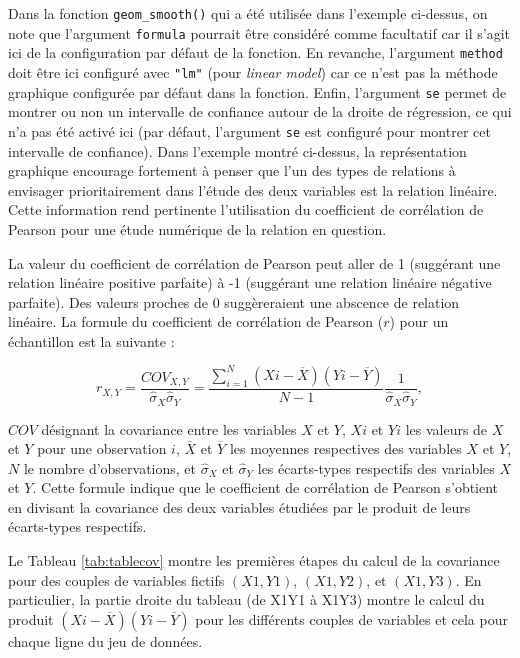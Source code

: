 \documentclass[
]{book}
\begin{document}
Dans la fonction \texttt{geom\_smooth()} qui a été utilisée dans l'exemple ci-dessus, on note que l'argument \texttt{formula} pourrait être considéré comme facultatif car il s'agit ici de la configuration par défaut de la fonction. En revanche, l'argument \texttt{method} doit être ici configuré avec \texttt{"lm"} (pour \emph{linear model}) car ce n'est pas la méthode graphique configurée par défaut dans la fonction. Enfin, l'argument \texttt{se} permet de montrer ou non un intervalle de confiance autour de la droite de régression, ce qui n'a pas été activé ici (par défaut, l'argument \texttt{se} est configuré pour montrer cet intervalle de confiance). Dans l'exemple montré ci-dessus, la représentation graphique encourage fortement à penser que l'un des types de relations à envisager prioritairement dans l'étude des deux variables est la relation linéaire. Cette information rend pertinente l'utilisation du coefficient de corrélation de Pearson pour une étude numérique de la relation en question.

La valeur du coefficient de corrélation de Pearson peut aller de 1 (suggérant une relation linéaire positive parfaite) à -1 (suggérant une relation linéaire négative parfaite). Des valeurs proches de 0 suggèreraient une abscence de relation linéaire. La formule du coefficient de corrélation de Pearson (\(r\)) pour un échantillon est la suivante :

\[r_{X,Y} =  {\frac{COV_{X,Y}}{\hat{\sigma}_{X} \hat{\sigma}_{Y}}} =  {\frac{\sum_{i=1}^{N} (X{i} - \overline{X}) (Y{i} - \overline{Y})}{N-1}} {\frac{1}{\hat{\sigma}_{X} \hat{\sigma}_{Y}}},\]

\(COV\) désignant la covariance entre les variables \(X\) et \(Y\), \(X{i}\) et \(Y{i}\) les valeurs de \(X\) et \(Y\) pour une observation \(i\), \(\overline{X}\) et \(\overline{Y}\) les moyennes respectives des variables \(X\) et \(Y\), \(N\) le nombre d'observations, et \(\hat{\sigma}_{X}\) et \(\hat{\sigma}_{Y}\) les écarts-types respectifs des variables \(X\) et \(Y\). Cette formule indique que le coefficient de corrélation de Pearson s'obtient en divisant la covariance des deux variables étudiées par le produit de leurs écarts-types respectifs.

Le Tableau \ref{tab:tablecov} montre les premières étapes du calcul de la covariance pour des couples de variables fictifs \((X1,Y1)\), \((X1,Y2)\), et \((X1,Y3)\). En particulier, la partie droite du tableau (de X1Y1 à X1Y3) montre le calcul du produit \((X{i} - \overline{X}) (Y{i} - \overline{Y})\) pour les différents couples de variables et cela pour chaque ligne du jeu de données.
\end{document}
